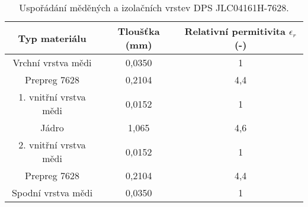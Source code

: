 \begin{table}[ht]
\centering

\begin{tabular}{|c|c|c|}
\hline 
Typ materiálu & Tloušťka (mm) & Relativní permitivita $ \epsilon_{r} $(-) \\ 
\hline 
\hline 
Vrchní vrstva mědi & 0,0350 & 1 \\ 
\hline 
Prepreg 7628 & 0,2104 & 4,4 \\ 
\hline 
1. vnitřní vrstva mědi & 0,0152 & 1 \\ 
\hline 
Jádro & 1,065 & 4,6 \\ 
\hline 
2. vnitřní vrstva mědi & 0,0152 & 1 \\ 
\hline 
Prepreg 7628 & 0,2104 & 4,4 \\ 
\hline 
Spodní vrstva mědi & 0,0350 & 1 \\ 
\hline 
\end{tabular} 

\caption{Uspořádání měděných a izolačních vrstev DPS JLC04161H-7628.} 
\label{table:materialStackup}
\end{table} 

